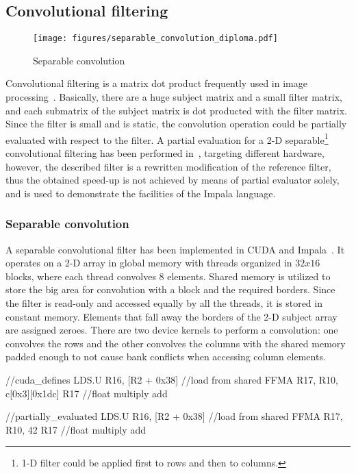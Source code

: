 \subsection{Convolutional filtering}

\begin{figure}[h!]
    \centering
    \texttt{[image: figures/separable\_convolution\_diploma.pdf]}
    \caption{Separable convolution}
    \label{fig:convolution}
\end{figure}

Convolutional filtering is a matrix dot product frequently used in image processing~\cite{chetlur2014cudnn}. Basically, there are a huge subject matrix and a small filter matrix, and each submatrix of the subject matrix is dot producted with the filter matrix.
Since the filter is small and is static, the convolution operation could be partially evaluated with respect to the filter.
A partial evaluation for a 2-D separable\footnote{1-D filter could be applied first to rows and then to columns.} convolutional filtering has been performed in~\cite{OnlinePe}, targeting different hardware, however, the described filter is a rewritten modification of the reference filter, thus the obtained speed-up is not achieved by means of partial evaluator solely, and is used to demonstrate the facilities of the Impala language.

\subsubsection{Separable convolution}

A separable convolutional filter has been implemented in CUDA and
Impala~\cite{CudaConv}. It operates on a 2-D array in global memory with
threads organized in $32 x 16$ blocks, where each thread convolves 8 elements.
Shared memory is utilized to store the big area for convolution with a block
and the required borders. Since the filter is read-only and accessed equally
by all the threads, it is stored in constant memory. Elements that fall away
the borders of the 2-D subject array are assigned zeroes.
There are two device kernels to perform a convolution: one convolves the rows
and the other convolves the columns with the shared memory padded enough to
not cause bank conflicts when accessing column elements.

\begin{listing}

\begin{pyglist}[language=C,label=code:conv,caption=Convolution partial evaluation]
//cuda_defines
LDS.U R16, [R2 + 0x38] //load from shared
FFMA R17, R10, c[0x3][0x1dc] R17 //float multiply add

//partially_evaluated
LDS.U R16, [R2 + 0x38] //load from shared
FFMA R17, R10, 42 R17 //float multiply add

\end{pyglist}
\end{listing}

